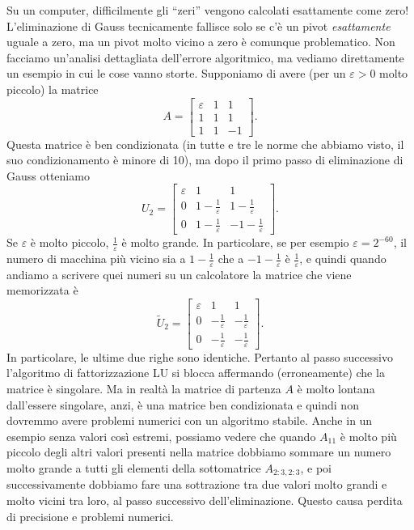 \documentclass[a4paper]{report}
\theoremstyle{definiton}
\theoremstyle{remark}
\begin{document}
Su un computer, difficilmente gli ``zeri'' vengono calcolati esattamente come zero! L'eliminazione di Gauss tecnicamente fallisce solo se c'è un pivot \emph{esattamente} uguale a zero, ma un pivot molto vicino a zero è comunque problematico. Non facciamo un'analisi dettagliata dell'errore algoritmico, ma vediamo direttamente un esempio in cui le cose vanno storte. Supponiamo di avere (per un $\varepsilon>0$ molto piccolo) la matrice
\[
A = \begin{bmatrix}
    \varepsilon & 1 & 1\\
    1 & 1 & 1\\
    1 & 1 & -1
\end{bmatrix}.
\]
Questa matrice è ben condizionata (in tutte e tre le norme che abbiamo visto, il suo condizionamento è minore di 10), ma dopo il primo passo di eliminazione di Gauss otteniamo
\[
U_2 = \begin{bmatrix}
    \varepsilon & 1 & 1\\
    0 & 1-\frac{1}{\varepsilon} & 1-\frac{1}{\varepsilon}\\
    0 & 1-\frac{1}{\varepsilon} & -1-\frac{1}{\varepsilon}
\end{bmatrix}.
\]
Se $\varepsilon$ è molto piccolo, $\frac{1}{\varepsilon}$ è molto grande. In particolare, se per esempio $\varepsilon = 2^{-60}$, il numero di macchina più vicino sia a $1-\frac{1}{\varepsilon}$ che a $-1-\frac{1}{\varepsilon}$ è $\frac{1}{\varepsilon}$, e quindi quando andiamo a scrivere quei numeri su un calcolatore la matrice che viene memorizzata è
\[
\tilde{U}_2 = 
\begin{bmatrix}  
    \varepsilon & 1 & 1\\
    0 & -\frac{1}{\varepsilon} & -\frac{1}{\varepsilon}\\
    0 & -\frac{1}{\varepsilon} & -\frac{1}{\varepsilon}
\end{bmatrix}.
\]
In particolare, le ultime due righe sono identiche. Pertanto al passo successivo l'algoritmo di fattorizzazione LU si blocca affermando (erroneamente) che la matrice è singolare. Ma in realtà la matrice di partenza $A$ è molto lontana dall'essere singolare, anzi, è una matrice ben condizionata e quindi non dovremmo avere problemi numerici con un algoritmo stabile. Anche in un esempio senza valori così estremi, possiamo vedere che quando $A_{11}$ è molto più piccolo degli altri valori presenti nella matrice dobbiamo sommare un numero molto grande a tutti gli elementi della sottomatrice $A_{2:3,2:3}$, e poi successivamente dobbiamo fare una sottrazione tra due valori molto grandi e molto vicini tra loro, al passo successivo dell'eliminazione. Questo causa perdita di precisione e problemi numerici.
\end{document}
